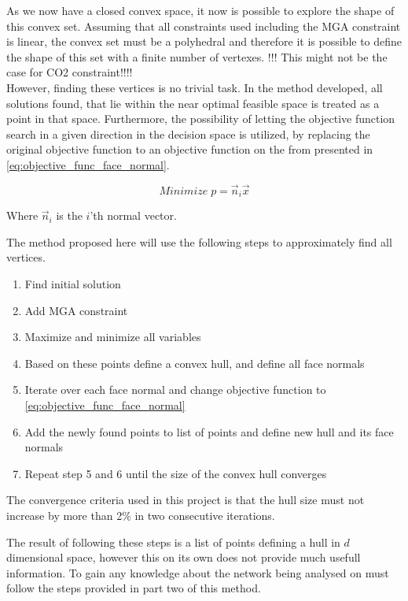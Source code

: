 As we now have a closed convex space, it now is possible to explore the shape of this convex set. Assuming that all constraints used including the MGA constraint is linear, the convex set must be a polyhedral and therefore it is possible to define the shape of this set with a finite number of vertexes. !!! This might not be the case for CO2 constraint!!!! \\

However, finding these vertices is no trivial task. In the method developed, all solutions found, that lie within the near optimal feasible space is treated as a point in that space. Furthermore, the possibility of letting the objective function search in a given direction in the decision space is utilized, by replacing the original objective function to an objective function on the from presented in \vref{eq:objective_func_face_normal}.

\begin{equation}\label{eq:objective_func_face_normal}
Minimize \; p = \vec{n}_i\vec{x}
\end{equation}

Where $\vec{n}_i$ is the $i$'th normal vector. 


The method proposed here will use the following steps to approximately find all vertices. 

\begin{enumerate}
	\item Find initial solution
	\item Add MGA constraint
	\item Maximize and minimize all variables
	\item Based on these points define a convex hull, and define all face normals
	\item Iterate over each face normal and change objective function to \vref{eq:objective_func_face_normal}
	\item Add the newly found points to list of points and define new hull and its face normals 
	\item Repeat step 5 and 6 until the size of the convex hull converges 
\end{enumerate}

The convergence criteria used in this project is that the hull size must not increase by more than 2\% in two consecutive iterations. 

The result of following these steps is a list of points defining a hull in $d$ dimensional space, however this on its own does not provide much usefull information. To gain any knowledge about the network being analysed on must follow the steps provided in part two of this method. 

